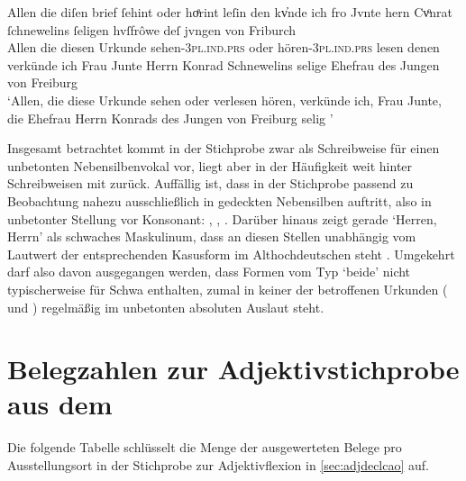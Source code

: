 \begin{exe}
\ex\label{ex:fribr_hoerint}
	\setlength{\glossglue}{5pt plus 2pt minus 2pt}
	\gll Allen die diſen brief ſehint oder hoͤrint leſin den kv̓nde ich fro
			Jvnte hern Cvͦnrat ſchnewelins ſeligen hvſfrôwe deſ jvngen von
			Friburch \textelp{} \\
		Allen die diesen Urkunde sehen-\textsc{3pl.ind.prs} oder
			hören-\textsc{3pl.ind.prs} lesen denen verkünde ich Frau Junte Herrn
			Konrad Schnewelins selige Ehefrau des Jungen von Freiburg \\
	\trans `Allen, die diese Urkunde sehen oder verlesen hören, verkünde
		ich, Frau Junte, die Ehefrau Herrn Konrads des Jungen von Freiburg
		selig \textelp{}'
		\parencites(Nr.~328, Freiburg i.\,Br., 1277)[314,33--34]{cao1}
\end{exe}

Insgesamt betrachtet kommt  in der Stichprobe zwar als Schreibweise für
einen unbetonten Nebensilbenvokal vor, liegt aber in der Häufigkeit weit hinter
Schreibweisen mit  zurück. Auffällig ist, dass  in der Stichprobe
passend zu  Beobachtung nahezu
ausschließlich in gedeckten Nebensilben auftritt, also in unbetonter Stellung
vor Konsonant: , , .
Darüber hinaus zeigt gerade  `Herren, Herrn' als schwaches
Maskulinum, dass  an diesen Stellen unabhängig vom Lautwert der
entsprechenden Kasusform im Althochdeutschen steht
\autocite[vgl.][282--283]{braune2018}. Umgekehrt darf also davon ausgegangen
werden, dass Formen vom Typ  `beide' nicht typischerweise
 für Schwa enthalten, zumal in keiner der betroffenen Urkunden
(\cites(Nrn.~81, 190)[124,18--33; 205,30--45]{cao1} und
\cites(Nr.~N~230)[175,1--33]{cao5}) regelmäßig  im unbetonten absoluten
Auslaut steht.

\chapter{Belegzahlen zur Adjektivstichprobe aus dem }
\label{sec:caoadjquanttab}

Die folgende Tabelle schlüsselt die Menge der ausgewerteten Belege pro
Ausstellungsort in der Stichprobe zur Adjektivflexion in \cref{sec:adjdeclcao}
auf.


